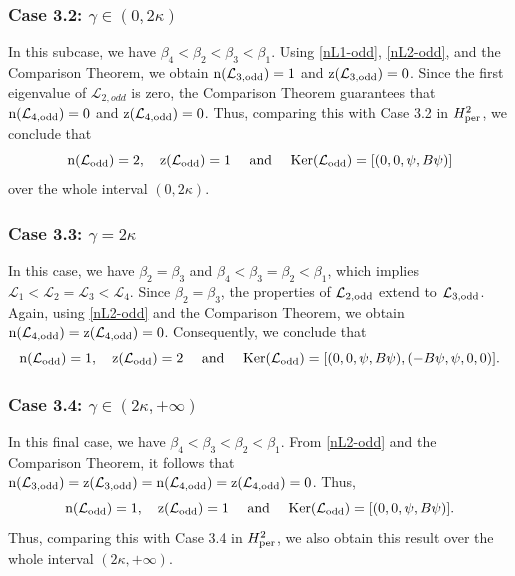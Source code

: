 \documentclass[10pt,reqno,a4paper]{amsart} %
\theoremstyle{definition} %
\numberwithin{equation}{section}
\numberwithin{figure}{section}
\begin{document}
\subsubsection*{Case 3.2: $\gamma \in (0,2\kappa)$} 
In this subcase, we have $\beta_4 < \beta_2 < \beta_3 < \beta_1$. Using \eqref{nL1-odd}, \eqref{nL2-odd}, and the Comparison Theorem, we obtain ${\rm n}(\mathcal{L}_{3,\rm odd}) = 1$ and ${\rm z}(\mathcal{L}_{3,\rm odd}) = 0$. Since the first eigenvalue of ${\mathcal{L}_{2,odd}}$ is zero, the Comparison Theorem guarantees that ${\rm n}(\mathcal{L}_{4,\rm odd}) = 0$ and ${\rm z}(\mathcal{L}_{4,\rm odd}) = 0$. Thus, comparing this with Case 3.2 in $H^2_{\rm per}$, we conclude that 
\begin{equation*}%
    {\rm n}(\mathcal{L}_{\rm odd}) = 2, \quad {\rm z}(\mathcal{L}_{\rm odd}) = 1 \quad \text{ and } \quad {\rm Ker}(\mathcal{L}_{\rm odd}) = [(0,0,\psi,B\psi)]
\end{equation*}
over the whole interval $(0,2\kappa)$.

\subsubsection*{Case 3.3: $\gamma = 2\kappa$} 
In this case, we have $\beta_2 = \beta_3$ and $\beta_4 < \beta_3 = \beta_2 < \beta_1$, which implies $\mathcal{L}_1 < \mathcal{L}_2 = \mathcal{L}_3 < \mathcal{L}_4$. Since $\beta_2 = \beta_3$, the properties of $\mathcal{L}_{2,\rm odd}$ extend to $\mathcal{L}_{3,\rm odd}$. Again, using \eqref{nL2-odd} and the Comparison Theorem, we obtain ${\rm n}(\mathcal{L}_{4,\rm odd}) = {\rm z}(\mathcal{L}_{4,\rm odd}) = 0$. Consequently, we conclude that
\begin{equation*}%
    {\rm n}(\mathcal{L}_{\rm odd}) = 1, \quad {\rm z}(\mathcal{L}_{\rm odd}) = 2 \quad \text{ and } \quad {\rm Ker}(\mathcal{L}_{\rm odd}) = [(0,0,\psi,B\psi), (-B\psi, \psi,0,0)].
\end{equation*}

\subsubsection*{Case 3.4: $\gamma \in (2\kappa, +\infty)$} 
In this final case, we have $\beta_4 < \beta_3 < \beta_2 < \beta_1$. From \eqref{nL2-odd} and the Comparison Theorem, it follows that ${\rm n}(\mathcal{L}_{3,\rm odd}) = {\rm z}(\mathcal{L}_{3,\rm odd}) = {\rm n}(\mathcal{L}_{4,\rm odd}) = {\rm z}(\mathcal{L}_{4,\rm odd}) = 0$. Thus,
\begin{equation}\label{spectralanalysis-B1-gamma-large}
    {\rm n}(\mathcal{L}_{\rm odd}) = 1, \quad {\rm z}(\mathcal{L}_{\rm odd}) = 1 \quad \text{ and } \quad {\rm Ker}(\mathcal{L}_{\rm odd}) = [(0,0,\psi,B\psi)].
\end{equation}
Thus, comparing this with Case 3.4 in $H^2_{\rm per}$, we also obtain this result over the whole interval $(2\kappa, +\infty)$. 
\end{document}

